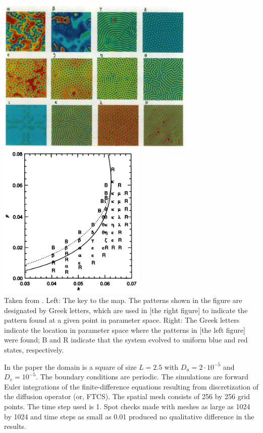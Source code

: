\begin{center}
\includegraphics[height=7.5cm]{python_codes/fieldstone_171/images/pear93a}
\includegraphics[height=7.5cm]{python_codes/fieldstone_171/images/pear93b}\\
{\captionfont Taken from \cite{pear93}. Left: The key to the map. The patterns 
shown in the figure are designated by Greek letters, which are used in 
[the right figure] to indicate the pattern found at a given point in parameter space.
Right: The Greek letters indicate the location in parameter
space where the patterns in [the left figure] were found; B and R indicate that
the system evolved to uniform blue and red states, respectively.
} 
\end{center}

In the paper the domain is a square of size $L=2.5$ with $D_u=2\cdot 10^{-5}$
and $D_v=10^{-5}$. The boundary conditions are periodic.
The simulations are forward Euler integrations of the finite-difference equations 
resulting from discretization of the diffusion operator (or, FTCS). 
The spatial mesh consists of 256 by 256
grid points. The time step used is 1. Spot checks made with meshes as large as 1024 by
1024 and time steps as small as 0.01 produced no qualitative difference in the results.

